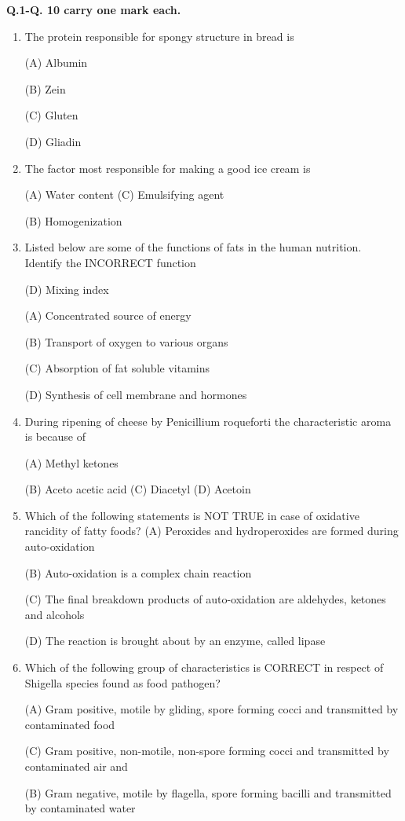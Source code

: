 \documentclass[journal]{IEEEtran}
\begin{document}
		\textbf{Q.1-Q. 10 carry one mark each.}

\begin{enumerate}
	\item{ The protein responsible for spongy structure in bread is

(A) Albumin

(B) Zein

(C) Gluten

(D) Gliadin
		}
	\item{ The factor most responsible for making a good ice cream is

(A) Water content (C) Emulsifying agent

(B) Homogenization

		}
	\item{ Listed below are some of the functions of fats in the human nutrition. Identify the INCORRECT function

(D) Mixing index

(A) Concentrated source of energy

(B) Transport of oxygen to various organs

(C) Absorption of fat soluble vitamins

(D) Synthesis of cell membrane and hormones
		}
	\item{ During ripening of cheese by Penicillium roqueforti the characteristic aroma is because of

(A) Methyl ketones

(B) Aceto acetic acid
(C) Diacetyl
(D) Acetoin
		}
	\item {Which of the following statements is NOT TRUE in case of oxidative rancidity of fatty foods?
(A) Peroxides and hydroperoxides are formed during auto-oxidation

(B) Auto-oxidation is a complex chain reaction

(C) The final breakdown products of auto-oxidation are aldehydes, ketones and alcohols

(D) The reaction is brought about by an enzyme, called lipase
		}
	\item{ Which of the following group of characteristics is CORRECT in respect of Shigella species found as food pathogen?

(A) Gram positive, motile by gliding, spore forming cocci and transmitted by contaminated food

(C) Gram positive, non-motile, non-spore forming cocci and transmitted by contaminated air and

		(B) Gram negative, motile by flagella, spore forming bacilli and transmitted by contaminated water

}
\end{enumerate}
\end{document}
